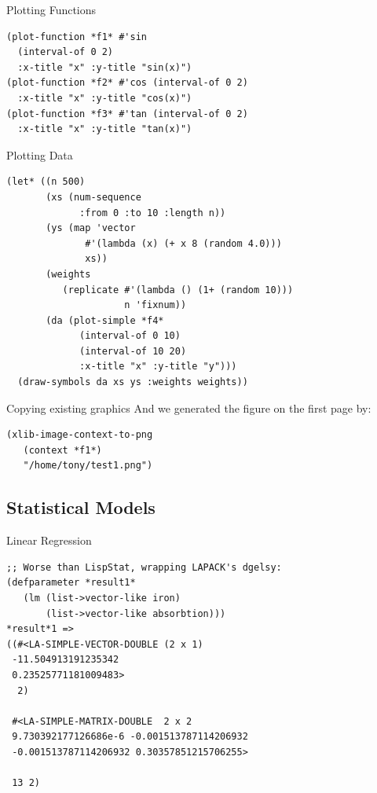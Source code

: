 \documentclass{beamer}
\begin{document}
\begin{frame}[fragile]{Plotting Functions}
\begin{verbatim}
(plot-function *f1* #'sin
  (interval-of 0 2)
  :x-title "x" :y-title "sin(x)")
(plot-function *f2* #'cos (interval-of 0 2)
  :x-title "x" :y-title "cos(x)")
(plot-function *f3* #'tan (interval-of 0 2)
  :x-title "x" :y-title "tan(x)")
\end{verbatim}
\end{frame}

\begin{frame}[fragile]{Plotting Data}
\small{
\begin{verbatim}
(let* ((n 500)
       (xs (num-sequence
             :from 0 :to 10 :length n))
       (ys (map 'vector
              #'(lambda (x) (+ x 8 (random 4.0)))
              xs))
       (weights
          (replicate #'(lambda () (1+ (random 10)))
                     n 'fixnum))
       (da (plot-simple *f4*
             (interval-of 0 10)
             (interval-of 10 20)
             :x-title "x" :y-title "y")))
  (draw-symbols da xs ys :weights weights))
\end{verbatim}
}
\end{frame}

\begin{frame}[fragile]{Copying existing graphics}
  And we generated the figure on the first page by:
\begin{verbatim}
(xlib-image-context-to-png
   (context *f1*)
   "/home/tony/test1.png")
\end{verbatim}
\end{frame}

\subsection{Statistical Models}
\label{sec:work:statmod}

\begin{frame}[fragile]{Linear Regression}
\small{
\begin{verbatim}
;; Worse than LispStat, wrapping LAPACK's dgelsy:
(defparameter *result1*
   (lm (list->vector-like iron)
       (list->vector-like absorbtion)))
*result*1 =>
((#<LA-SIMPLE-VECTOR-DOUBLE (2 x 1)
 -11.504913191235342
 0.23525771181009483>
  2)

 #<LA-SIMPLE-MATRIX-DOUBLE  2 x 2
 9.730392177126686e-6 -0.001513787114206932
 -0.001513787114206932 0.30357851215706255>   

 13 2)
\end{verbatim}
}
\end{frame}
\end{document}
